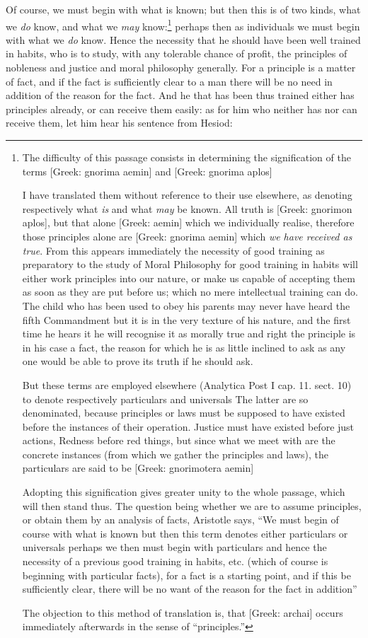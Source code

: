 Of course, we must begin with what is known; but then this is of two kinds,
what we \emph{do} know, and what we \emph{may} know:\footnote{The difficulty of this passage consists in determining the signification of the
terms [Greek: gnorima aemin] and [Greek: gnorima aplos]

I have translated them without reference to their use elsewhere, as denoting
respectively what \emph{is} and what \emph{may} be known. All truth is [Greek:
gnorimon aplos], but that alone [Greek: aemin] which we individually realise,
therefore those principles alone are [Greek: gnorima aemin] which \emph{we have
received as true}. From this appears immediately the necessity of good
training as preparatory to the study of Moral Philosophy for good training in
habits will either work principles into our nature, or make us capable of
accepting them as soon as they are put before us; which no mere intellectual
training can do. The child who has been used to obey his parents may never have
heard the fifth Commandment but it is in the very texture of his nature, and
the first time he hears it he will recognise it as morally true and right the
principle is in his case a fact, the reason for which he is as little inclined
to ask as any one would be able to prove its truth if he should ask.

But these terms are employed elsewhere (Analytica Post I cap. 11. sect. 10) to
denote respectively particulars and universals The latter are so denominated,
because principles or laws must be supposed to have existed before the
instances of their operation. Justice must have existed before just actions,
Redness before red things, but since what we meet with are the concrete
instances (from which we gather the principles and laws), the particulars are
said to be [Greek: gnorimotera aemin]

Adopting this signification gives greater unity to the whole passage, which
will then stand thus. The question being whether we are to assume principles,
or obtain them by an analysis of facts, Aristotle says, “We must begin of
course with what is known but then this term denotes either particulars or
universals perhaps we then must begin with particulars and hence the necessity
of a previous good training in habits, etc. (which of course is beginning with
particular facts), for a fact is a starting point, and if this be sufficiently
clear, there will be no want of the reason for the fact in addition”

The objection to this method of translation is, that [Greek: archai] occurs
immediately afterwards in the sense of “principles.”}
perhaps then as individuals we must begin with what we \emph{do} know. Hence
the necessity that he should have been well trained in habits, who is to study,
with any tolerable chance of profit, the principles of nobleness and justice
and moral philosophy generally. For a principle is a matter of fact, and if the
fact is sufficiently clear to a man there will be no need in addition of the
reason for the fact. And he that has been thus trained either has principles
already, or can receive them easily: as for him who neither has nor can receive
them, let him hear his sentence from Hesiod:

